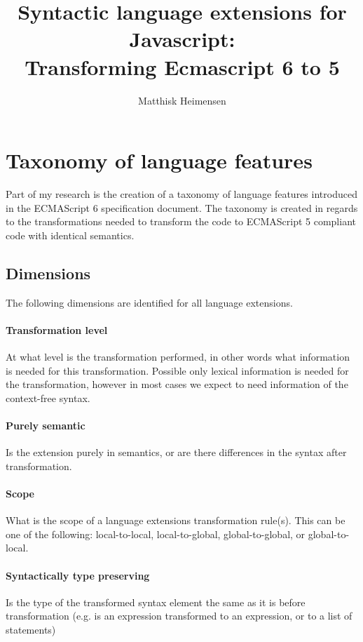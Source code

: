 \documentclass[10pt,a4paper]{article}
\title{%
	Syntactic language extensions for Javascript: \\
	\large Transforming Ecmascript 6 to 5}
\author{Matthisk Heimensen}
\begin{document}
\lstset{language=Pascal}
	\maketitle
	\tableofcontents
\section{Taxonomy of language features}
Part of my research is the creation of a taxonomy of language features introduced in the ECMAScript 6 specification document. The taxonomy is created in regards to the transformations needed to transform the code to ECMAScript 5 compliant code with identical semantics.

\subsection{Dimensions}
The following dimensions are identified for all language extensions.

\paragraph{Transformation level}
At what level is the transformation performed, in other words what information is needed for this transformation. Possible only lexical information is needed for the transformation, however in most cases we expect to need information of the context-free syntax.

\paragraph{Purely semantic}
Is the extension purely in semantics, or are there differences in the syntax after transformation.

\paragraph{Scope}
What is the scope of a language extensions transformation rule(s). This can be one of the following: local-to-local, local-to-global, global-to-global, or global-to-local.

\paragraph{Syntactically type preserving}
Is the type of the transformed syntax element the same as it is before transformation (e.g. is an expression transformed to an expression, or to a list of statements)
\end{document}
